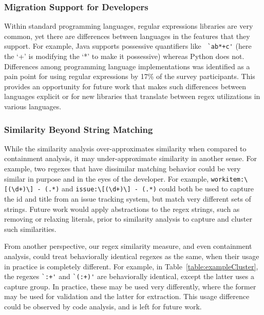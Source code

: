 \subsubsection{Migration  Support for Developers}
Within standard programming languages, regular expressions libraries are very common, yet there are  differences between languages in the features that they support. For example, Java supports possessive quantifiers like \verb! `ab*+c'! (here the `+' is modifying the `*' to make it possessive) whereas Python does not. Differences among programming language implementations was identified as a pain point for using regular expressions by 17\% of the survey participants. This provides an opportunity for future work that makes such differences between languages explicit or for new libraries that translate between regex utilizations in various languages.


\subsubsection{Similarity Beyond String Matching}
While the similarity analysis over-approximates similarity when compared to containment analysis, it may under-approximate similarity in another sense.
For example, two regexes that have dissimilar matching behavior could be very similar in purpose and in the eyes of the developer. For example, \verb!workitem:\[(\d+)\] - (.*)! and \verb!issue:\[(\d+)\] - (.*)! could both be used to  capture the id and title from an issue tracking system, but match very different sets of strings. Future work would apply abstractions to the regex strings, such as removing or relaxing literals, prior to similarity analysis to capture and cluster such similarities.

From another perspective, our regex similarity measure, and even containment analysis, could treat behaviorally identical regexes as the same, when  their usage in practice is completely different. For example, in Table~\ref{table:exampleCluster}, the regexes \verb!`:+'! and \verb!`(:+)'! are behaviorally identical, except the latter uses a capture group. In practice, these may be used very differently, where the former may be used for validation and the latter for extraction. This usage difference could be observed by code  analysis, and is left for future work.


